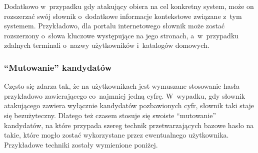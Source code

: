 Dodatkowo w~przypadku gdy atakujący obiera na cel konkretny system, może on
rozszerzać swój słownik o~dodatkowe informacje kontekstowe związane
z~tym systemem. Przykładowo, dla portalu internetowego słownik może zostać
rozszerzony o~słowa kluczowe występujące na jego stronach, a~w~przypadku
zdalnych terminali o~nazwy użytkowników i~katalogów domowych.



\subsubsection{``Mutowanie'' kandydatów}
Często się zdarza tak, że na użytkownikach jest wymuszane stosowanie hasła
przykładowo zawierającego co~najmniej jedną cyfrę. W~wypadku, gdy słownik
atakującego zawiera wyłącznie kandydatów pozbawionych cyfr, słownik taki
staje się bezużyteczny. Dlatego też czasem stosuje się swoiste ``mutowanie''
kandydatów, na które przypada szereg technik przetwarzających bazowe hasło na
takie, które mogło zostać wykorzystane przez ewentualnego użytkownika.
Przykładowe techniki zostały wymienione poniżej.

